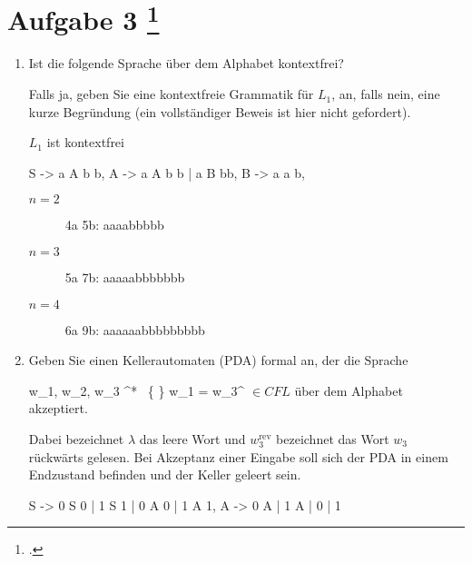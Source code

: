 \documentclass{lehramt-informatik-aufgabe}
\begin{document}
\section{Aufgabe 3
\footcite{66115:2020:03}}

\begin{enumerate}


\item Ist die folgende Sprache 
über dem Alphabet  kontextfrei?

Falls ja, geben Sie eine kontextfreie Grammatik für $L_1$, an, falls
nein, eine kurze Begründung (ein vollständiger Beweis ist hier nicht
gefordert).

\begin{liAntwort}
$L_1$ ist kontextfrei

\begin{liProduktionsRegeln}
S -> a A b b,
A -> a A b b | a B bb,
B -> a a b,
\end{liProduktionsRegeln}

\begin{description}
\item[$n = 2$] 4a 5b: aaaabbbbb
\item[$n = 3$] 5a 7b: aaaaabbbbbbb
\item[$n = 4$] 6a 9b: aaaaaabbbbbbbbb
\end{description}
\end{liAntwort}


\item Geben Sie einen Kellerautomaten (PDA) formal an, der die Sprache

{w_1, w_2, w_3 \in \Sigma^* \string\ \{ \lambda \}
w_1 = w_3^{}
} $\in CFL$
über dem Alphabet 
akzeptiert.

Dabei bezeichnet $\lambda$ das leere Wort und $w_3^{\text{rev}}$
bezeichnet das Wort $w_3$ rückwärts gelesen. Bei Akzeptanz einer Eingabe
soll sich der PDA in einem Endzustand befinden und der Keller geleert
sein.

\begin{liAntwort}

\begin{liProduktionsRegeln}
S -> 0 S 0 | 1 S 1 | 0 A 0 | 1 A 1,
A -> 0 A | 1 A | 0 | 1
\end{liProduktionsRegeln}


\end{liAntwort}
\end{enumerate}
\end{document}
